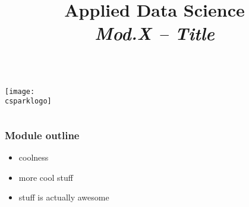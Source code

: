 \documentclass{beamer}
\begin{document}

\title{
	{\LARGE Applied Data Science}\\[.2cm]
	\emph{Mod.X -- Title}
} 
\date{} %

{
\begin{frame}
  \vspace*{2.5cm}
    \titlepage
	\begin{columns}
		\begin{column}{.45\textwidth}
			\begin{flushleft}
				\vspace*{.2cm}
				\texttt{[image: \\csparklogo]}
			\end{flushleft}
		\end{column}
		\begin{column}{.45\textwidth}
		    \begin{flushright}
            \end{flushright}
		\end{column}
	\end{columns}
\end{frame}
}
\addtocounter{framenumber}{-1}


\begin{frame}
\frametitle{Module outline}
    \begin{itemize}
        \item coolness
        \item more cool stuff
        \item stuff is actually awesome
    \end{itemize}
\end{frame}




\end{document}
